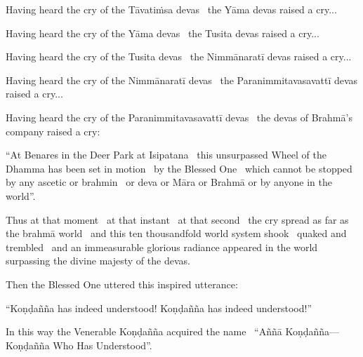 \begin{english-only-hang}
  Having heard the cry of the Tāvatiṁsa devas \breathmark\ the Yāma devas raised a cry...
\end{english-only-hang}

\begin{english-only-hang}
  Having heard the cry of the Yāma devas \breathmark\ the Tusita devas raised a cry...
\end{english-only-hang}

\begin{english-only-hang}
  Having heard the cry of the Tusita devas \breathmark\ the Nimmānaratī devas raised a cry...
\end{english-only-hang}

\begin{english-only-hang}
  Having heard the cry of the Nimmānaratī devas \breathmark\ the Paranimmitavasavattī devas raised a cry...
\end{english-only-hang}

\begin{english-only-hang}
  Having heard the cry of the Paranimmitavasavattī devas \breathmark\ the devas of Brahmā's company raised a cry:
\end{english-only-hang}

\begin{english-only-hang}
  ``At Benares in the Deer Park at Isipatana \breathmark\ this unsurpassed Wheel of the Dhamma has been set in motion \breathmark\ by the Blessed One \breathmark\ which cannot be stopped by any ascetic or brahmin \breathmark\ or deva or Māra or Brahmā or by anyone in the world''.
\end{english-only-hang}

\begin{english-only-hang}
  Thus at that moment \breathmark\ at that instant \breathmark\ at that second \breathmark\ the cry spread as far as the brahmā world \breathmark\ and this ten thousandfold world system shook \breathmark\ quaked and trembled \breathmark\ and an immeasurable glorious radiance appeared in the world surpassing the divine majesty of the devas.
\end{english-only-hang}

\begin{english-only-hang}
  Then the Blessed One uttered this inspired utterance:
\end{english-only-hang}

\begin{english-only-hang}
  ``Koṇḍañña has indeed understood! Koṇḍañña has indeed understood!''
\end{english-only-hang}

\begin{english-only-hang}
  In this way the Venerable Koṇḍañña acquired the name \breathmark\ ``Aññā Koṇḍañña—Koṇḍañña Who Has Understood''.
\end{english-only-hang}

\suttaRef{[SN 56.11]}

